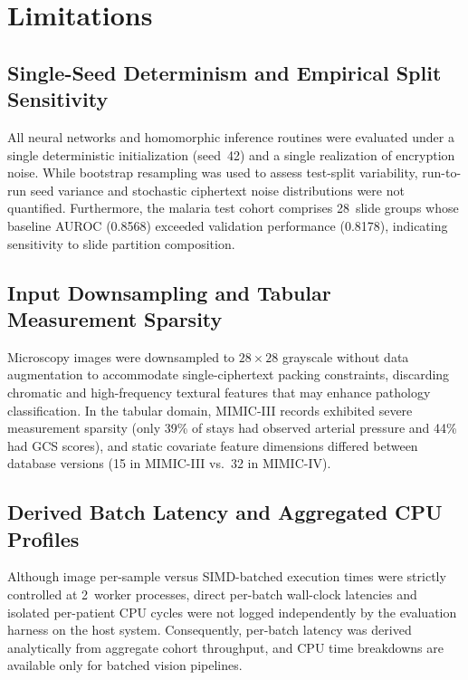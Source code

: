 \documentclass[conference]{IEEEtran}
\begin{document}
\section{Limitations}\label{sec:limitations}

\subsection{Single-Seed Determinism and Empirical Split Sensitivity}
All neural networks and homomorphic inference routines were evaluated under a single deterministic initialization (seed~42) and a single realization of encryption noise. While bootstrap resampling was used to assess test-split variability, run-to-run seed variance and stochastic ciphertext noise distributions were not quantified. Furthermore, the malaria test cohort comprises 28~slide groups whose baseline AUROC (0.8568) exceeded validation performance (0.8178), indicating sensitivity to slide partition composition.

\subsection{Input Downsampling and Tabular Measurement Sparsity}
Microscopy images were downsampled to $28 \times 28$ grayscale without data augmentation to accommodate single-ciphertext packing constraints, discarding chromatic and high-frequency textural features that may enhance pathology classification. In the tabular domain, MIMIC-III records exhibited severe measurement sparsity (only 39\% of stays had observed arterial pressure and 44\% had GCS scores), and static covariate feature dimensions differed between database versions (15 in MIMIC-III vs.\ 32 in MIMIC-IV).

\subsection{Derived Batch Latency and Aggregated CPU Profiles}
Although image per-sample versus SIMD-batched execution times were strictly controlled at 2~worker processes, direct per-batch wall-clock latencies and isolated per-patient CPU cycles were not logged independently by the evaluation harness on the host system. Consequently, per-batch latency was derived analytically from aggregate cohort throughput, and CPU time breakdowns are available only for batched vision pipelines.
\end{document}
